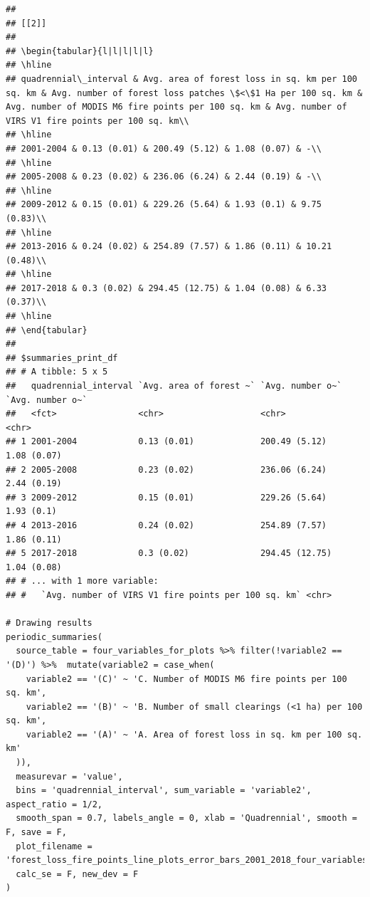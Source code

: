 \documentclass[10pt,landscape,a3paper]{article}
\begin{document}
\begin{verbatim}
## 
## [[2]]
## 
## \begin{tabular}{l|l|l|l|l}
## \hline
## quadrennial\_interval & Avg. area of forest loss in sq. km per 100 sq. km & Avg. number of forest loss patches \$<\$1 Ha per 100 sq. km & Avg. number of MODIS M6 fire points per 100 sq. km & Avg. number of VIRS V1 fire points per 100 sq. km\\
## \hline
## 2001-2004 & 0.13 (0.01) & 200.49 (5.12) & 1.08 (0.07) & -\\
## \hline
## 2005-2008 & 0.23 (0.02) & 236.06 (6.24) & 2.44 (0.19) & -\\
## \hline
## 2009-2012 & 0.15 (0.01) & 229.26 (5.64) & 1.93 (0.1) & 9.75 (0.83)\\
## \hline
## 2013-2016 & 0.24 (0.02) & 254.89 (7.57) & 1.86 (0.11) & 10.21 (0.48)\\
## \hline
## 2017-2018 & 0.3 (0.02) & 294.45 (12.75) & 1.04 (0.08) & 6.33 (0.37)\\
## \hline
## \end{tabular}
## 
## $summaries_print_df
## # A tibble: 5 x 5
##   quadrennial_interval `Avg. area of forest ~` `Avg. number o~` `Avg. number o~`
##   <fct>                <chr>                   <chr>            <chr>           
## 1 2001-2004            0.13 (0.01)             200.49 (5.12)    1.08 (0.07)     
## 2 2005-2008            0.23 (0.02)             236.06 (6.24)    2.44 (0.19)     
## 3 2009-2012            0.15 (0.01)             229.26 (5.64)    1.93 (0.1)      
## 4 2013-2016            0.24 (0.02)             254.89 (7.57)    1.86 (0.11)     
## 5 2017-2018            0.3 (0.02)              294.45 (12.75)   1.04 (0.08)     
## # ... with 1 more variable:
## #   `Avg. number of VIRS V1 fire points per 100 sq. km` <chr>

# Drawing results
periodic_summaries(
  source_table = four_variables_for_plots %>% filter(!variable2 == '(D)') %>%  mutate(variable2 = case_when(
    variable2 == '(C)' ~ 'C. Number of MODIS M6 fire points per 100 sq. km',
    variable2 == '(B)' ~ 'B. Number of small clearings (<1 ha) per 100 sq. km',
    variable2 == '(A)' ~ 'A. Area of forest loss in sq. km per 100 sq. km'
  )),
  measurevar = 'value',
  bins = 'quadrennial_interval', sum_variable = 'variable2', aspect_ratio = 1/2,
  smooth_span = 0.7, labels_angle = 0, xlab = 'Quadrennial', smooth = F, save = F,
  plot_filename = 'forest_loss_fire_points_line_plots_error_bars_2001_2018_four_variables_quadrennial.jpg',
  calc_se = F, new_dev = F
)
\end{verbatim}
\end{document}
